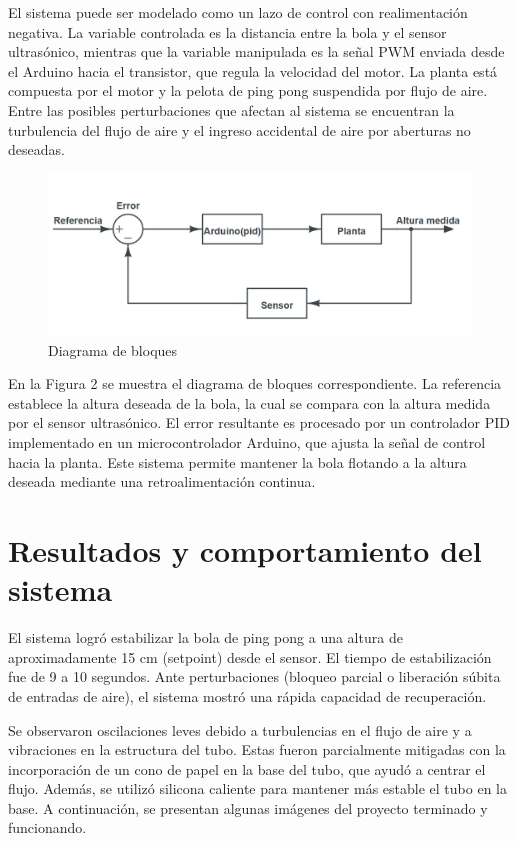 \documentclass[12pt]{article}
\begin{document}
El sistema puede ser modelado como un lazo de control con realimentación negativa. La variable controlada es la distancia entre la bola y el sensor ultrasónico, mientras que la variable manipulada es la señal PWM enviada desde el Arduino hacia el transistor, que regula la velocidad del motor. La planta está compuesta por el motor y la pelota de ping pong suspendida por flujo de aire. Entre las posibles perturbaciones que afectan al sistema se encuentran la turbulencia del flujo de aire y el ingreso accidental de aire por aberturas no deseadas.


\begin{figure}[h!]
    \centering
    \includegraphics[width=0.9\linewidth]{imagenes/bloques.png}
    \caption{Diagrama de bloques}
\end{figure}

En la Figura 2 se muestra el diagrama de bloques correspondiente. La referencia establece la altura deseada de la bola, la cual se compara con la altura medida por el sensor ultrasónico. El error resultante es procesado por un controlador PID implementado en un microcontrolador Arduino, que ajusta la señal de control hacia la planta. Este sistema permite mantener la bola flotando a la altura deseada mediante una retroalimentación continua.


\section{Resultados y comportamiento del sistema}

El sistema logró estabilizar la bola de ping pong a una altura de aproximadamente 15 cm (setpoint) desde el sensor. El tiempo de estabilización fue de 9 a 10 segundos. Ante perturbaciones (bloqueo parcial o liberación súbita de entradas de aire), el sistema mostró una rápida capacidad de recuperación.

Se observaron oscilaciones leves debido a turbulencias en el flujo de aire y a vibraciones en la estructura del tubo. Estas fueron parcialmente mitigadas con la incorporación de un cono de papel en la base del tubo, que ayudó a centrar el flujo. Además, se utilizó silicona caliente para mantener más estable el tubo en la base. A continuación, se presentan algunas imágenes del proyecto terminado y funcionando.
\end{document}
